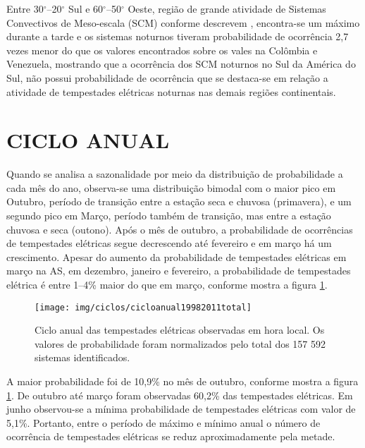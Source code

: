 Entre 30$^{\circ}$--20$^{\circ}$ Sul e 60$^{\circ}$--50$^{\circ}$ Oeste,  região de grande atividade de Sistemas Convectivos de Meso-escala (SCM) conforme descrevem , encontra-se um máximo durante a tarde e os sistemas noturnos tiveram probabilidade de ocorrência 2,7 vezes menor do que os valores encontrados sobre os vales na Colômbia e Venezuela, mostrando que a ocorrência dos SCM noturnos no Sul da América do Sul, não possui probabilidade de ocorrência que se destaca-se em relação a atividade de tempestades elétricas noturnas nas demais regiões continentais. 



\section{CICLO ANUAL}
\label{cicloanualsecao}

Quando se analisa a sazonalidade por meio da distribuição de probabilidade a cada mês do ano, observa-se uma distribuição bimodal com o maior pico em Outubro, período de transição entre a estação seca e chuvosa (primavera), e um segundo pico em Março, período também de transição, mas entre a estação chuvosa e seca (outono). Após o mês de outubro, a probabilidade de ocorrências de tempestades elétricas segue decrescendo até fevereiro e em março há um crescimento. Apesar do aumento da probabilidade de tempestades elétricas em março na AS, em dezembro, janeiro e fevereiro, a  probabilidade de tempestades elétrica é entre 1--4\% maior do que em março, conforme mostra a figura \ref{cicloanualtotal}. 



\begin{figure}[!h]
\centering
{\texttt{[image: img/ciclos/cicloanual19982011total]}}
\caption{Ciclo anual das tempestades elétricas observadas em hora local. Os valores de probabilidade foram normalizados pelo total dos {157 592} sistemas identificados.}
\label{cicloanualtotal}
\end{figure} 

A maior probabilidade foi de 10,9\%  no mês de outubro, conforme mostra a figura \ref{cicloanualtotal}. De outubro até março foram observadas 60,2\% das tempestades elétricas. Em junho observou-se a mínima probabilidade de tempestades elétricas com valor de 5,1\%. Portanto, entre o período de máximo e mínimo anual o número de ocorrência de tempestades elétricas se reduz aproximadamente pela metade.


